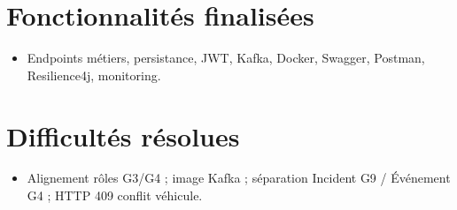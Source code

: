 \documentclass[12pt,a4paper]{report}
\begin{document}
\section*{Fonctionnalités finalisées}
\begin{itemize}
    \item Endpoints métiers, persistance, JWT, Kafka, Docker, Swagger, Postman, Resilience4j, monitoring.
\end{itemize}

\section*{Difficultés résolues}
\begin{itemize}
    \item Alignement rôles G3/G4 ; image Kafka ; séparation Incident G9 / Événement G4 ; HTTP 409 conflit véhicule.
\end{itemize}
\end{document}

